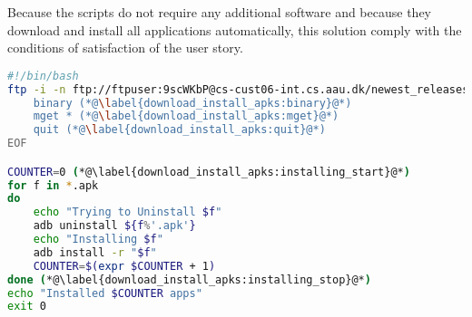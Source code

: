 Because the scripts do not require any additional software and because they download and install all applications automatically, this solution comply with the conditions of satisfaction of the user story.

\begin{lstlisting}[language=bash,caption=Unix script that downloads and installs newest APKs,label=lst:download_install_apks_unix]
#!/bin/bash
ftp -i -n ftp://ftpuser:9scWKbP@cs-cust06-int.cs.aau.dk/newest_releases/ << EOF (*@\label{download_install_apks:ftp_start}@*)
    binary (*@\label{download_install_apks:binary}@*)
    mget * (*@\label{download_install_apks:mget}@*)
    quit (*@\label{download_install_apks:quit}@*)
EOF

COUNTER=0 (*@\label{download_install_apks:installing_start}@*)
for f in *.apk
do
    echo "Trying to Uninstall $f"
    adb uninstall ${f%'.apk'}
    echo "Installing $f"
    adb install -r "$f"
    COUNTER=$(expr $COUNTER + 1)
done (*@\label{download_install_apks:installing_stop}@*)
echo "Installed $COUNTER apps"
exit 0
\end{lstlisting}
